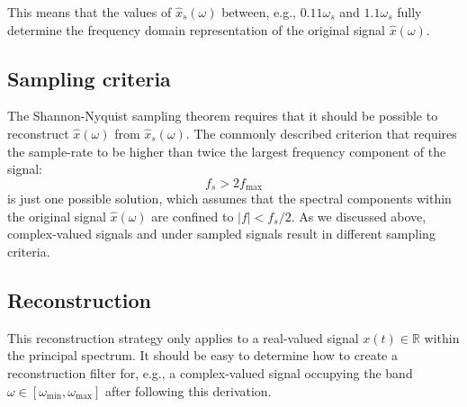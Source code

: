 This means that the values of $\hat{x}_s(\omega)$ between, e.g., $0.11\omega_s$ and $1.1\omega_s$ fully determine the frequency domain representation of the original signal $\hat{x}(\omega)$.

\subsection{Sampling criteria}
The Shannon-Nyquist sampling theorem requires that it should be possible to reconstruct $\hat{x}(\omega)$ from
$\hat{x}_s(\omega)$. The commonly described criterion that requires the sample-rate to be higher than twice the largest frequency component of the signal:
\begin{equation}
f_s > 2 f_\mathrm{max} 
\end{equation}
is just one possible solution, which assumes that the spectral components within the original signal $\hat{x}(\omega)$ are confined to $|f| < f_s/2$. As we discussed above, complex-valued signals and under sampled signals result in different sampling criteria.

\subsection{Reconstruction}
This reconstruction strategy only applies to a real-valued signal $x(t) \in \mathbb{R}$ within the principal spectrum. 
It should be easy to determine how to create a reconstruction filter for, e.g., a complex-valued signal occupying the band $\omega \in
[\omega_{\mathrm{min}},\omega_{\mathrm{max}}]$ after following this derivation.

